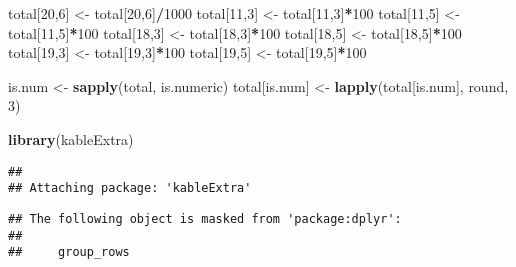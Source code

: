 \documentclass[]{article}
\newenvironment{Shaded}{\begin{snugshade}}{\end{snugshade}}
\newcommand{\KeywordTok}[1]{\textcolor[rgb]{0.13,0.29,0.53}{\textbf{#1}}}
\newcommand{\DecValTok}[1]{\textcolor[rgb]{0.00,0.00,0.81}{#1}}
\newcommand{\StringTok}[1]{\textcolor[rgb]{0.31,0.60,0.02}{#1}}
\newcommand{\OperatorTok}[1]{\textcolor[rgb]{0.81,0.36,0.00}{\textbf{#1}}}
\newcommand{\NormalTok}[1]{#1}
\begin{document}
\begin{Shaded}
\begin{Highlighting}[]
\NormalTok{total[}\DecValTok{20}\NormalTok{,}\DecValTok{6}\NormalTok{] <-}\StringTok{ }\NormalTok{total[}\DecValTok{20}\NormalTok{,}\DecValTok{6}\NormalTok{]}\OperatorTok{/}\DecValTok{1000}
\NormalTok{total[}\DecValTok{11}\NormalTok{,}\DecValTok{3}\NormalTok{] <-}\StringTok{ }\NormalTok{total[}\DecValTok{11}\NormalTok{,}\DecValTok{3}\NormalTok{]}\OperatorTok{*}\DecValTok{100}
\NormalTok{total[}\DecValTok{11}\NormalTok{,}\DecValTok{5}\NormalTok{] <-}\StringTok{ }\NormalTok{total[}\DecValTok{11}\NormalTok{,}\DecValTok{5}\NormalTok{]}\OperatorTok{*}\DecValTok{100}
\NormalTok{total[}\DecValTok{18}\NormalTok{,}\DecValTok{3}\NormalTok{] <-}\StringTok{ }\NormalTok{total[}\DecValTok{18}\NormalTok{,}\DecValTok{3}\NormalTok{]}\OperatorTok{*}\DecValTok{100}
\NormalTok{total[}\DecValTok{18}\NormalTok{,}\DecValTok{5}\NormalTok{] <-}\StringTok{ }\NormalTok{total[}\DecValTok{18}\NormalTok{,}\DecValTok{5}\NormalTok{]}\OperatorTok{*}\DecValTok{100}
\NormalTok{total[}\DecValTok{19}\NormalTok{,}\DecValTok{3}\NormalTok{] <-}\StringTok{ }\NormalTok{total[}\DecValTok{19}\NormalTok{,}\DecValTok{3}\NormalTok{]}\OperatorTok{*}\DecValTok{100}
\NormalTok{total[}\DecValTok{19}\NormalTok{,}\DecValTok{5}\NormalTok{] <-}\StringTok{ }\NormalTok{total[}\DecValTok{19}\NormalTok{,}\DecValTok{5}\NormalTok{]}\OperatorTok{*}\DecValTok{100}


\NormalTok{is.num <-}\StringTok{ }\KeywordTok{sapply}\NormalTok{(total, is.numeric)}
\NormalTok{total[is.num] <-}\StringTok{ }\KeywordTok{lapply}\NormalTok{(total[is.num], round, }\DecValTok{3}\NormalTok{)}
\end{Highlighting}
\end{Shaded}

\begin{Shaded}
\begin{Highlighting}[]
\KeywordTok{library}\NormalTok{(kableExtra)}
\end{Highlighting}
\end{Shaded}

\begin{verbatim}
## 
## Attaching package: 'kableExtra'
\end{verbatim}

\begin{verbatim}
## The following object is masked from 'package:dplyr':
## 
##     group_rows
\end{verbatim}
\end{document}
